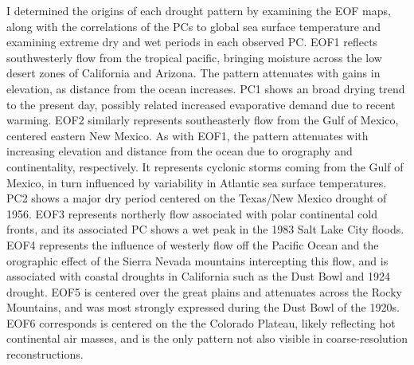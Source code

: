 \documentclass[11pt]{iopart}
\begin{document}
I determined the origins of each drought pattern by examining the EOF maps, along with the correlations of the PCs to global sea surface temperature and examining extreme dry and wet periods in each observed PC. EOF1 reflects southwesterly flow from the tropical pacific, bringing moisture across the low desert zones of California and Arizona. The pattern attenuates with gains in elevation, as distance from the ocean increases. PC1 shows an broad drying trend to the present day, possibly related increased evaporative demand due to recent warming. EOF2 similarly represents southeasterly flow from the Gulf of Mexico, centered eastern New Mexico. As with EOF1, the pattern attenuates with increasing elevation and distance from the ocean due to orography and continentality, respectively. It represents cyclonic storms coming from the Gulf of Mexico, in turn influenced by variability in Atlantic sea surface temperatures. PC2 shows a major dry period centered on the Texas/New Mexico drought of 1956. EOF3 represents northerly flow associated with polar continental cold fronts, and its associated PC shows a wet peak in the 1983 Salt Lake City floods. EOF4 represents the influence of westerly flow off the Pacific Ocean and the orographic effect of the Sierra Nevada mountains intercepting this flow, and is associated with coastal droughts in California such as the Dust Bowl and 1924 drought. EOF5 is centered over the great plains and attenuates across the Rocky Mountains, and was most strongly expressed during the Dust Bowl of the 1920s. EOF6 corresponds is centered on the the Colorado Plateau, likely reflecting hot continental air masses, and is the only pattern not also visible in coarse-resolution reconstructions.


\end{document}
